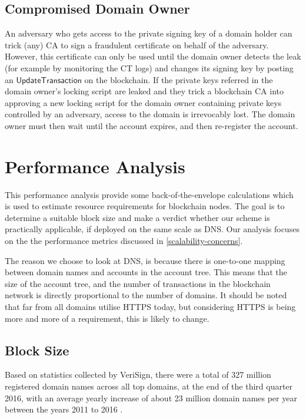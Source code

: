 \documentclass{style/kththesis}
\begin{document}
\subsection{Compromised Domain Owner}
An adversary who gets access to the private signing key of a domain holder can trick (any) CA to sign a fraudulent certificate on behalf of the adversary. However, this certificate can only be used until the domain owner detects the leak (for example by monitoring the CT logs) and changes its signing key by posting an $\mathsf{UpdateTransaction}$ on the blockchain. If the private keys referred in the domain owner's locking script are leaked and they trick a blockchain CA into approving a new locking script for the domain owner containing private keys controlled by an adversary, access to the domain is irrevocably lost. The domain owner must then wait until the account expires, and then re-register the account.

\section{Performance Analysis}
\label{performance-analysis}
This performance analysis provide some back-of-the-envelope calculations which is used to estimate resource requirements for blockchain nodes. The goal is to determine a suitable block size and make a verdict whether our scheme is practically applicable, if deployed on the same scale as DNS. Our analysis focuses on the the performance metrics discussed in \cref{scalability-concerns}.

The reason we choose to look at DNS, is because there is one-to-one mapping between domain names and accounts in the account tree. This means that the size of the account tree, and the number of transactions in the blockchain network is directly proportional to the number of domains. It should be noted that far from all domains utilise HTTPS today, but considering HTTPS is being more and more of a requirement, this is likely to change. 

\subsection{Block Size}
Based on statistics collected by VeriSign, there were a total of 327 million registered domain names across all top domains, at the end of the third quarter 2016, with an average yearly increase of about 23 million domain names per year between the years 2011 to 2016 \cite{VeriSign16}. 
\end{document}
